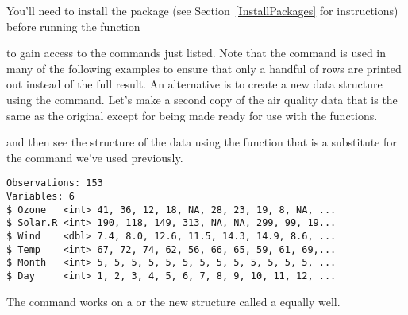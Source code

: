 You'll need to install the package (see Section~\ref{InstallPackages} for instructions) before running the function 
\begin{knitrout}
\color{fgcolor}\begin{kframe}
\begin{alltt}
\hlstd{> }
\end{alltt}


{\ttfamily\noindent\itshape\color{messagecolor}{\\Attaching package: 'dplyr'}}

{\ttfamily\noindent\itshape\color{messagecolor}{The following objects are masked from 'package:stats':

\ \ \ \ filter, lag}}

{\ttfamily\noindent\itshape\color{messagecolor}{The following objects are masked from 'package:base':

\ \ \ \ intersect, setdiff, setequal, union}}\end{kframe}
\end{knitrout}
to gain access to the commands just listed. Note that the  command is used in many of the following examples to ensure that only a handful of rows are printed out instead of the full result. An alternative is to create a new data structure using the  command. Let's make a second copy of the air quality data that is the same as the original except for being made ready for use with the  functions. 
\begin{knitrout}
\color{fgcolor}\begin{kframe}
\begin{alltt}
\hlstd{> } \hlkwb{=} 
\end{alltt}
\end{kframe}
\end{knitrout}
and then see the structure of the data using the  function that is a substitute for the  command we've used previously. 
\begin{knitrout}
\color{fgcolor}\begin{kframe}
\begin{alltt}
\hlstd{> }
\end{alltt}
\begin{verbatim}
Observations: 153
Variables: 6
$ Ozone   <int> 41, 36, 12, 18, NA, 28, 23, 19, 8, NA, ...
$ Solar.R <int> 190, 118, 149, 313, NA, NA, 299, 99, 19...
$ Wind    <dbl> 7.4, 8.0, 12.6, 11.5, 14.3, 14.9, 8.6, ...
$ Temp    <int> 67, 72, 74, 62, 56, 66, 65, 59, 61, 69,...
$ Month   <int> 5, 5, 5, 5, 5, 5, 5, 5, 5, 5, 5, 5, 5, ...
$ Day     <int> 1, 2, 3, 4, 5, 6, 7, 8, 9, 10, 11, 12, ...
\end{verbatim}
\end{kframe}
\end{knitrout}
The  command works on a  or the new structure called a  equally well. 
  
